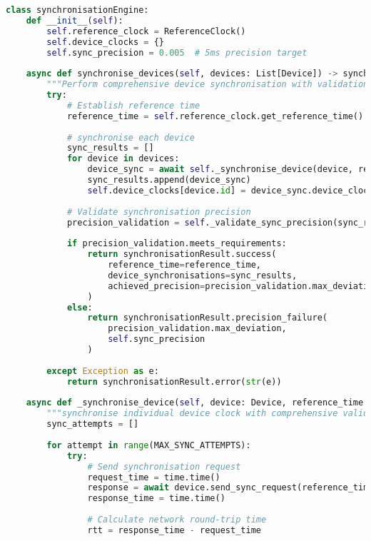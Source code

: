 \documentclass[11pt,a4paper]{report}
\begin{document}
\begin{lstlisting}[language=Python]
class synchronisationEngine:
    def __init__(self):
        self.reference_clock = ReferenceClock()
        self.device_clocks = {}
        self.sync_precision = 0.005  # 5ms precision target
        
    async def synchronise_devices(self, devices: List[Device]) -> synchronisationResult:
        """Perform comprehensive device synchronisation with validation."""
        try:
            # Establish reference time
            reference_time = self.reference_clock.get_reference_time()
            
            # synchronise each device
            sync_results = []
            for device in devices:
                device_sync = await self._synchronise_device(device, reference_time)
                sync_results.append(device_sync)
                self.device_clocks[device.id] = device_sync.device_clock
            
            # Validate synchronisation precision
            precision_validation = self._validate_sync_precision(sync_results)
            
            if precision_validation.meets_requirements:
                return synchronisationResult.success(
                    reference_time=reference_time,
                    device_synchronisations=sync_results,
                    achieved_precision=precision_validation.max_deviation
                )
            else:
                return synchronisationResult.precision_failure(
                    precision_validation.max_deviation,
                    self.sync_precision
                )
                
        except Exception as e:
            return synchronisationResult.error(str(e))
    
    async def _synchronise_device(self, device: Device, reference_time: float) -> DeviceSyncResult:
        """synchronise individual device clock with comprehensive validation."""
        sync_attempts = []
        
        for attempt in range(MAX_SYNC_ATTEMPTS):
            try:
                # Send synchronisation request
                request_time = time.time()
                response = await device.send_sync_request(reference_time)
                response_time = time.time()
                
                # Calculate network round-trip time
                rtt = response_time - request_time
                

\end{lstlisting}
\end{document}

